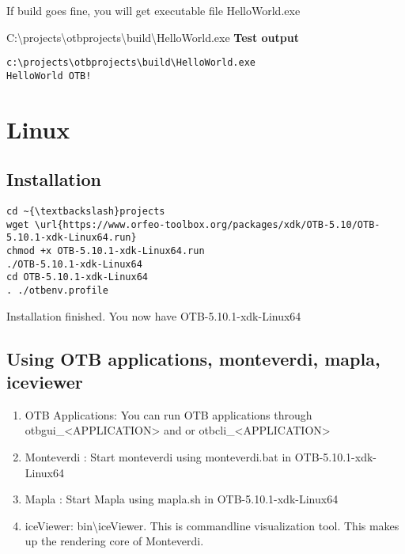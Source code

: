 \documentclass[10pt,a4paper]{article}
\begin{document}
If build goes fine, you will get executable file HelloWorld.exe
\newline

C:{\textbackslash}projects{\textbackslash}otbprojects{\textbackslash}build{\textbackslash}HelloWorld.exe
\newline
\textbf{Test output}

\begin{verbatim}
c:\projects\otbprojects\build\HelloWorld.exe
HelloWorld OTB!
\end{verbatim}






\section{Linux}

\subsection{Installation}

\begin{verbatim}
cd ~{\textbackslash}projects
wget \url{https://www.orfeo-toolbox.org/packages/xdk/OTB-5.10/OTB-5.10.1-xdk-Linux64.run}
chmod +x OTB-5.10.1-xdk-Linux64.run
./OTB-5.10.1-xdk-Linux64
cd OTB-5.10.1-xdk-Linux64
. ./otbenv.profile
\end{verbatim}

Installation finished. You now have OTB-5.10.1-xdk-Linux64

\subsection{Using OTB applications, monteverdi, mapla, iceviewer}
\begin{enumerate}
\item OTB Applications: You can run OTB applications through otbgui\_<APPLICATION> and or otbcli\_<APPLICATION> 
\item Monteverdi : Start monteverdi using monteverdi.bat in OTB-5.10.1-xdk-Linux64
\item Mapla : Start Mapla using mapla.sh in OTB-5.10.1-xdk-Linux64
\item iceViewer: bin{\textbackslash}iceViewer. This is commandline visualization tool. This makes up the rendering core of Monteverdi.
\end{enumerate}
\end{document}
